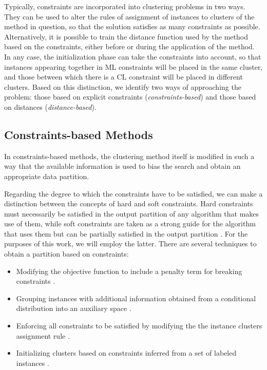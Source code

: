 Typically, constraints are incorporated into clustering problems in two ways. They can be used to alter the rules of assignment of instances to clusters of the method in question, so that the solution satisfies as many constraints as possible. Alternatively, it is possible to train the distance function used by the method based on the constraints, either before or during the application of the method. In any case, the initialization phase can take the constraints into account, so that instances appearing together in \acs{ML} constraints will be placed in the same cluster, and those between which there is a \acs{CL} constraint will be placed in different clusters. Based on this distinction, we identify two ways of approaching the problem: those based on explicit constraints (\textit{constraints-based}) and those based on distances (\textit{distance-based}).

\subsection{Constraints-based Methods}

In constraints-based methods, the clustering method itself is modified in such a way that the available information is used to bias the search and obtain an appropriate data partition.

Regarding the degree to which the constraints have to be satisfied, we can make a distinction between the concepts of hard \cite{wagstaff2001constrained,davidson2005agglomerative} and soft \cite{law2004clustering,basu2004active,segal2003discovering,davidson2005clustering,law2005model} constraints. Hard constraints must necessarily be satisfied in the output partition of any algorithm that makes use of them, while soft constraints are taken as a strong guide for the algorithm that uses them but can be partially satisfied in the output partition \cite{seret2014new}. For the purposes of this work, we will employ the latter. There are several techniques to obtain a partition based on constraints:

\begin{itemize}
	
	\item Modifying the objective function to include a penalty term for breaking constraints \cite{demiriz1999semi,davidson2005clustering}.
	
	\item Grouping instances with additional information obtained from a conditional distribution into an auxiliary space \cite{sinkkonen2000semisupervised}.
	
	\item Enforcing all constraints to be satisfied by modifying the the instance clusters assignment rule \cite{wagstaff2001constrained}.
	
	\item Initializing clusters based on constraints inferred from a set of labeled instances \cite{basu2002semi}.
	
\end{itemize}

